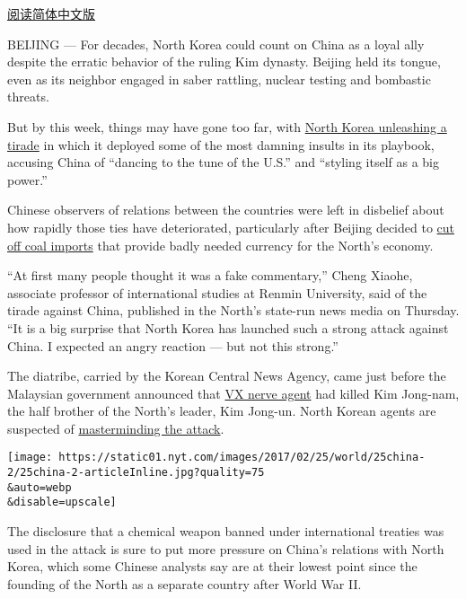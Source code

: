 \href{http://cn.nytimes.com/asia-pacific/20170227/china-north-korea-relations-kim-jong-un/}{阅读简体中文版}

BEIJING --- For decades, North Korea could count on China as a loyal
ally despite the erratic behavior of the ruling Kim dynasty. Beijing
held its tongue, even as its neighbor engaged in saber rattling, nuclear
testing and bombastic threats.

But by this week, things may have gone too far, with
\href{https://www.nytimes.com/2017/02/23/world/asia/north-korea-china.html}{North
Korea unleashing a tirade} in which it deployed some of the most damning
insults in its playbook, accusing China of ``dancing to the tune of the
U.S.'' and ``styling itself as a big power.''

Chinese observers of relations between the countries were left in
disbelief about how rapidly those ties have deteriorated, particularly
after Beijing decided to
\href{https://www.nytimes.com/2017/02/18/world/asia/north-korea-china-coal-imports-suspended.html}{cut
off coal imports} that provide badly needed currency for the North's
economy.

``At first many people thought it was a fake commentary,'' Cheng Xiaohe,
associate professor of international studies at Renmin University, said
of the tirade against China, published in the North's state-run news
media on Thursday. ``It is a big surprise that North Korea has launched
such a strong attack against China. I expected an angry reaction --- but
not this strong.''

The diatribe, carried by the Korean Central News Agency, came just
before the Malaysian government announced that
\href{https://www.nytimes.com/2017/02/24/world/asia/vx-nerve-agent-kim-jong-nam.html}{VX
nerve agent} had killed Kim Jong-nam, the half brother of the North's
leader, Kim Jong-un. North Korean agents are suspected of
\href{https://www.nytimes.com/2017/02/22/world/asia/kim-jong-nam-assassination-korea-malaysia.html}{masterminding
the attack}.

\texttt{[image: https://static01.nyt.com/images/2017/02/25/world/25china-2/25china-2-articleInline.jpg?quality=75\\\&auto=webp\\\&disable=upscale]}

The disclosure that a chemical weapon banned under international
treaties was used in the attack is sure to put more pressure on China's
relations with North Korea, which some Chinese analysts say are at their
lowest point since the founding of the North as a separate country after
World War II.

